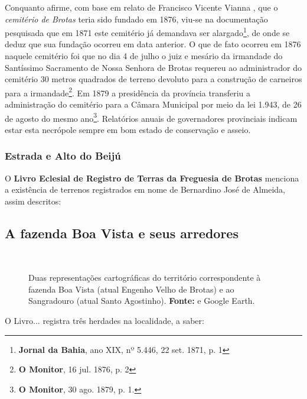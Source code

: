 Conquanto  afirme, com base em relato de Francisco Vicente Vianna \cite[p.~371]{vianna_bahia_1893}, que o \textit{cemitério de Brotas} teria sido fundado em 1876, viu-se na documentação pesquisada que em 1871 este cemitério já demandava ser alargado\footnote{\textbf{Jornal da Bahia}, ano XIX, nº 5.446, 22 set. 1871, p. 1}, de onde se deduz que sua fundação ocorreu em data anterior. O que de fato ocorreu em 1876 naquele cemitério foi que no dia 4 de julho o juiz e mesário da irmandade do Santíssimo Sacramento de Nossa Senhora de Brotas requereu ao administrador do cemitério 30 metros quadrados de terreno devoluto para a construção de carneiros para a irmandade\footnote{\textbf{O Monitor}, 16 jul. 1876, p. 2}. Em 1879 a presidência da província transferiu a administração do cemitério para a Câmara Municipal por meio da lei 1.943, de 26 de agosto do mesmo ano\footnote{\textbf{O Monitor}, 30 ago. 1879, p. 1.}. Relatórios anuais de governadores provinciais indicam estar esta necrópole sempre em bom estado de conservação e asseio.

\subsubsection{Estrada e Alto do Beijú}

O \textbf{Livro Eclesial de Registro de Terras da Freguesia de Brotas} menciona a existência de terrenos registrados em nome de Bernardino José de Almeida, assim descritos:




\subsection{A fazenda Boa Vista e seus arredores}

\begin{figure}[!htp]
\centering
{}
\  %
\caption{Duas representações cartográficas do território correspondente à fazenda Boa Vista (atual Engenho Velho de Brotas) e ao Sangradouro (atual Santo Agostinho). \textbf{Fonte:}  e Google Earth.}
\end{figure}

O Livro... registra três herdades na localidade, a saber:





